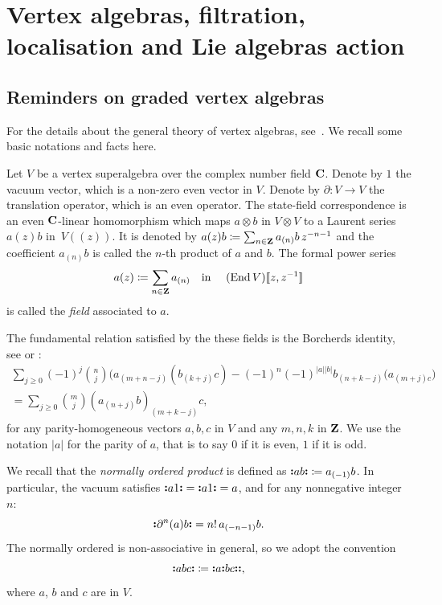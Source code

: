 
\section{Vertex algebras, filtration, localisation and Lie algebras action} \label{section:vertex-algebra}

\subsection{Reminders on graded vertex algebras} \label{subsection:vertex-algebras}

For the details about the general theory of vertex algebras, see~\cite{kac1998vertex,frenkel2004vertex,desole2006finite}. We recall some basic notations and facts here.

Let $V$ be a vertex superalgebra over the complex number field $\mathbf{C}$. Denote by $1$ the vacuum vector, which is a non-zero even vector in $V$. Denote by $\partial : V \rightarrow V$ the translation operator, which is an even operator. The state-field correspondence is an even $\mathbf{C}$-linear homomorphism which maps $a \otimes b$ in $V \otimes V$ to a Laurent series $a(z) b$ in~$V(\!(z)\!)$. It is denoted by $a(z)b \coloneqq \sum_{n \in \mathbf{Z}} a_{(n)}b\, z^{-n-1}$ and the coefficient $a_{(n)}b$ is called the $n$-th product of $a$ and $b$. The formal power series
\[ a(z) \coloneqq \sum_{n \in \mathbf{Z}} a_{(n)} \quad \text{in }\quad (\operatorname{End} V)[\![z, z^{-1}]\!] \]
is called the \emph{field} associated to $a$.

The fundamental relation satisfied by the these fields is the Borcherds identity, see \cite[Section 3.3.10]{frenkel2004vertex} or \cite[(1.28)]{desole2006finite}:
\begin{equation} \label{equation:borcherds}
	\begin{multlined}
	\sum_{j \geqslant 0} (-1)^j \binom{n}{j} \big(a_{(m + n - j)}(b_{(k + j)} c) - (-1)^n (-1)^{|a||b|} b_{(n + k - j)} (a_{(m + j) c} \big) \\
	= \sum_{j \geqslant 0} \binom{m}{j} (a_{(n + j)} b)_{(m + k - j)} c,
	\end{multlined}  
\end{equation}
for any parity-homogeneous vectors $a, b, c$ in $V$ and any $m, n, k$ in $\mathbf{Z}$. We use the notation $|a|$ for the parity of $a$, that is to say $0$ if it is even, $1$ if it is odd.


We recall that the \emph{normally ordered product} is defined as $\mathopen{\boldsymbol{\vcentcolon}}a b\mathclose{\boldsymbol{\vcentcolon}} \coloneqq a_{(-1)} b$. In particular, the vacuum satisfies $\mathopen{\boldsymbol{\vcentcolon}}a 1\mathclose{\boldsymbol{\vcentcolon}} = \mathopen{\boldsymbol{\vcentcolon}}a 1\mathclose{\boldsymbol{\vcentcolon}} = a$, and for any nonnegative integer $n$:
\[ \mathopen{\boldsymbol{\vcentcolon}}\partial^n(a) b\mathclose{\boldsymbol{\vcentcolon}} = n! \, a_{(-n - 1)} b. \]
The normally ordered is non-associative in general, so we adopt the convention
\[ \mathopen{\boldsymbol{\vcentcolon}}a b c\mathclose{\boldsymbol{\vcentcolon}} \coloneqq \mathopen{\boldsymbol{\vcentcolon}}a \mathopen{\boldsymbol{\vcentcolon}}b c\mathclose{\boldsymbol{\vcentcolon}}\mathclose{\boldsymbol{\vcentcolon}}, \]
where $a$, $b$ and $c$ are in $V$.


